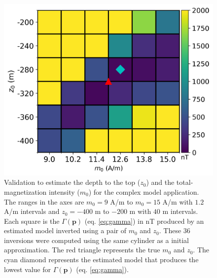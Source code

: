\begin{figure}
	\centering
	\includegraphics[scale=.75]{figures/complex_gamma.png}
	\caption{Validation to estimate the depth to the top ($ z_0 $) and the total-magnetization intensity ($ m_0 $) for the complex model application. The ranges in the axes are $m_0 = 9$ A/m to $m_0=15$ A/m with $1.2$ A/m intervals and $z_0=-400$ m to $-200$ m with $40$ m intervals. Each square is the $\Gamma (\mathbf{p})$ (eq. \ref{eq:gamma}) in nT produced by an estimated model inverted using a pair of $m_0$ and $z_0$. These 36 inversions were computed using the same cylinder as a initial approximation. The red triangle represents the true $m_0$ and $z_0$. The cyan diamond represents the estimated model that produces the lowest value for $\Gamma (\mathbf{p})$ (eq. \ref{eq:gamma}).
	}
	\label{fig:complex_map}
\end{figure}

